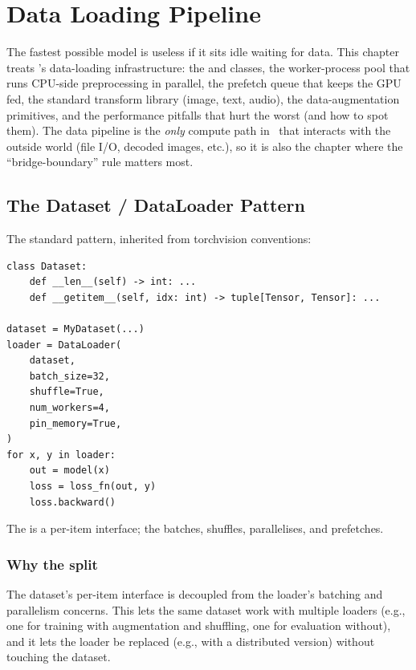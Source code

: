 \chapter{Data Loading Pipeline}
\label{ch:data_pipeline}

The fastest possible model is useless if it sits idle waiting
for data. This chapter treats \Lucid's data-loading
infrastructure: the  and 
classes, the worker-process pool that runs CPU-side
preprocessing in parallel, the prefetch queue that keeps the
GPU fed, the standard transform library
(image, text, audio), the data-augmentation primitives, and the
performance pitfalls that hurt the worst (and how to spot
them). The data pipeline is the \emph{only} compute path in
\Lucid\ that interacts with the outside world (file I/O, decoded
images, etc.), so it is also the chapter where the
``bridge-boundary'' rule \cite{numpy_van_der_walt_2011}
matters most.

\section{The Dataset / DataLoader Pattern}
\label{sec:data_pipeline:dataset_dataloader}

The standard pattern, inherited from torchvision conventions:

\begin{lstlisting}[style=lucid,language=LucidPython]
class Dataset:
    def __len__(self) -> int: ...
    def __getitem__(self, idx: int) -> tuple[Tensor, Tensor]: ...

dataset = MyDataset(...)
loader = DataLoader(
    dataset,
    batch_size=32,
    shuffle=True,
    num_workers=4,
    pin_memory=True,
)
for x, y in loader:
    out = model(x)
    loss = loss_fn(out, y)
    loss.backward()
\end{lstlisting}

The  is a per-item interface; the
 batches, shuffles, parallelises, and prefetches.

\subsection{Why the split}
\label{ssec:data_pipeline:why_split}

The dataset's per-item interface is decoupled from the loader's
batching and parallelism concerns. This lets the same dataset
work with multiple loaders (e.g., one for training with
augmentation and shuffling, one for evaluation without), and it
lets the loader be replaced (e.g., with a distributed version)
without touching the dataset.

